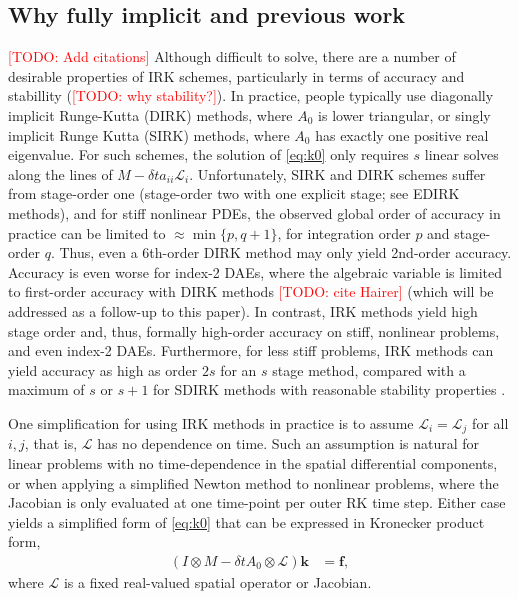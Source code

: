 \documentclass[review]{siamart}
\makeatletter
\newcommand{\todo}[1]{\textcolor{red}{[TODO\@: #1]}}
\makeatother
\begin{document}
\subsection{Why fully implicit and previous work}\label{sec:intro:hist}

\todo{Add citations}
Although difficult to solve, there are a number of desirable properties of IRK schemes,
particularly in terms of accuracy and stabillity (\todo{why stability?}).
In practice, people typically use
diagonally implicit Runge-Kutta (DIRK) methods, where $A_0$ is lower triangular, or
singly implicit Runge Kutta (SIRK) methods, where $A_0$ has exactly one positive real
eigenvalue. For such schemes, the solution of \eqref{eq:k0} only requires $s$ linear
solves along the lines of $M - \delta ta_{ii}\mathcal{L}_i$. Unfortunately, SIRK and DIRK
schemes suffer from stage-order one (stage-order two with one explicit stage; see
EDIRK methods), and for
stiff nonlinear PDEs, the observed global order of accuracy in practice can be limited to
$\approx \min\{ p, q+1\}$, for integration order $p$ and stage-order $q$. Thus, even
a 6th-order DIRK method may only yield 2nd-order accuracy. Accuracy is even worse for
index-2 DAEs, where the algebraic variable is limited to first-order accuracy with
DIRK methods \todo{cite Hairer} (which will be addressed as a follow-up to this paper). 
In contrast, IRK methods yield high stage order and, thus, formally high-order accuracy
on stiff, nonlinear problems, and even index-2 DAEs. Furthermore, for less stiff
problems, IRK methods can yield accuracy as high as order $2s$ for an $s$ stage method,
compared with a maximum of $s$ or $s+1$ for SDIRK methods with reasonable stability
properties \cite[Section IV.6]{hairer96}.

One simplification for using IRK methods in practice is to assume $\mathcal{L}_i =
\mathcal{L}_j$ for all $i,j$, that is, $\mathcal{L}$ has no dependence on time. Such
an assumption is natural for linear problems with no time-dependence in the spatial
differential components, or when applying a simplified Newton method to nonlinear
problems, where the Jacobian is only evaluated at one time-point per outer RK time
step. Either case yields a simplified form of \eqref{eq:k0} that can be expressed in
Kronecker product form,
%
\begin{align}\label{eq:kron1}
(I\otimes M - \delta t A_0\otimes \mathcal{L})\mathbf{k} & = \mathbf{f},
\end{align}
%
where $\mathcal{L}$ is a fixed real-valued spatial operator or Jacobian.
\end{document}
